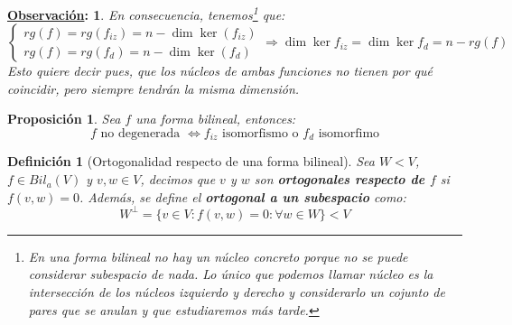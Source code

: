 \documentclass[10pt,a4paper,openright]{book}
\theoremstyle{break}
\newtheorem*{defi}{Definición}
\newtheorem*{prop}{Proposición}
\newtheorem*{obs}{\underline{Observación}:}
\begin{document}
\begin{obs}
En consecuencia, tenemos\footnote{En una forma bilineal no hay un núcleo concreto porque no se puede considerar subespacio de nada. Lo único que podemos llamar núcleo es la intersección de los núcleos izquierdo y derecho y considerarlo un cojunto de pares que se anulan y que estudiaremos más tarde.} que:
$$\begin{cases} rg(f) = rg(f_{iz}) = n - \dim \ker(f_{iz}) \\ rg(f) = rg(f_{d}) = n - \dim \ker(f_{d})  \end{cases}\Rightarrow \dim \ker f_{iz} = \dim \ker f_d = n - rg(f)$$
Esto quiere decir pues, que los núcleos de ambas funciones no tienen por qué coincidir, pero siempre tendrán la misma dimensión.
\end{obs}

\begin{prop}
Sea $f$ una forma bilineal, entonces:
$$f \mbox{ no degenerada }\Leftrightarrow f_{iz} \mbox{ isomorfismo o }f_{d} \mbox{ isomorfimo}$$
\end{prop}

\begin{defi}[Ortogonalidad respecto de una forma bilineal]
Sea $W<V$, $f\in Bil_a(V)$ y $v,w\in V$, decimos que $v$ y $w$ son \textbf{ortogonales respecto de $f$} si $f(v,w)=0$. Además, se define el \textbf{ortogonal a un subespacio} como:
$$W^\perp=\{v\in V: f(v,w)=0: \forall w\in W\} < V$$
\end{defi}
\end{document}

